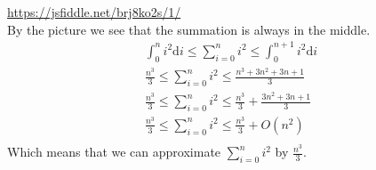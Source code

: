 \documentclass{article}
\begin{document}
	\url{https://jsfiddle.net/brj8ko2s/1/}\\
	By the picture we see that the summation is always in the middle.
	\\
	\begin{align*}
		\int_{0}^{n}{i^2\mathrm{d}i} \le \sum_{i=0}^{n}{i^2} \le \int_{0}^{n+1}{i^2\mathrm{d}i}\\
		\frac{n^ 3}{3} \le \sum_{i=0}^{n}{i^2} \le \frac{n^{3} + 3n^{2} + 3n + 1}{3}\\
		\frac{n^ 3}{3} \le \sum_{i=0}^{n}{i^2} \le \frac{n^{3}}{3} + \frac{3n^{2} + 3n + 1}{3}\\		
		\frac{n^ 3}{3} \le \sum_{i=0}^{n}{i^2} \le \frac{n^{3}}{3} + O(n^{2})\\
	\end{align*}
	Which means that we can approximate $\sum_{i=0}^{n}{i^2}$ by $\frac{n^ 3}{3}$.
\end{document}
